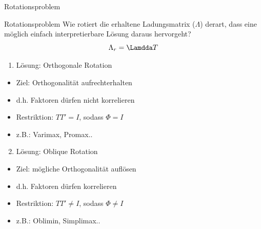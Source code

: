 \documentclass[
  ignorenonframetext,
]{beamer}
\providecommand{\tightlist}{%
  \setlength{\itemsep}{0pt}\setlength{\parskip}{0pt}}
\begin{document}
\begin{frame}{Rotationsproblem}
\protect\hypertarget{rotationsproblem}{}
\begin{alertblock}{Rotationsproblem}
  Wie rotiert die erhaltene Ladungsmatrix ($\Lambda$) derart, dass eine
  möglich einfach interpretierbare Lösung daraus hervorgeht?
  \begin{equation}
    \Lambda_r = \Lamdda T 
  \end{equation}
\end{alertblock}

\begin{enumerate}
\tightlist
\item
  Lösung: Orthogonale Rotation
\end{enumerate}

\begin{itemize}
\tightlist
\item
  Ziel: Orthogonalität aufrechterhalten
\item
  d.h. Faktoren dürfen nicht korrelieren
\item
  Restriktion: \(TT' = I\), sodass \(\Phi=I\)
\item
  z.B.: Varimax, Promax..
\end{itemize}

\begin{enumerate}
\setcounter{enumi}{1}
\tightlist
\item
  Lösung: Oblique Rotation
\end{enumerate}

\begin{itemize}
\tightlist
\item
  Ziel: mögliche Orthogonalität auflösen
\item
  d.h. Faktoren dürfen korrelieren
\item
  Restriktion: \(TT' \neq I\), sodass \(\Phi\neq I\)
\item
  z.B.: Oblimin, Simplimax..
\end{itemize}
\end{frame}
\end{document}
